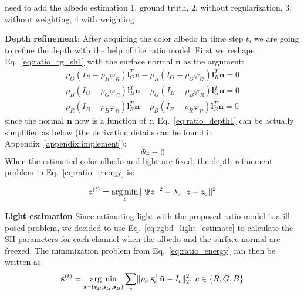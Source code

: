 {\color{red} need to add the albedo estimation 1, ground truth, 2, without regularization, 3, without weighting, 4 with weighting}

\textbf{Depth refinement}:
After acquiring the color albedo in time step $t$, we are going to refine the depth with the help of the ratio model.
First we reshape Eq.~\ref{eq:ratio_rg_sh1} with the surface normal $\mathbf{n}$ as the argument:
\begin{equation}\label{eq:ratio_depth1}
\begin{split}
\rho_G (I_R - \rho_R \varphi_R)\mathbf{l}_G^T \mathbf{n} - \rho_R (I_G - \rho_G \varphi_G)\mathbf{l}_R^T\mathbf{n} = 0\\
\rho_B (I_G - \rho_G \varphi_G)\mathbf{l}_B^T \mathbf{n} - \rho_G (I_B - \rho_B \varphi_B)\mathbf{l}_G^T\mathbf{n} = 0\\
\rho_R (I_B - \rho_B \varphi_B)\mathbf{l}_R^T \mathbf{n} - \rho_B (I_R - \rho_R \varphi_R)\mathbf{l}_B^T\mathbf{n} = 0 
\end{split}
\end{equation}
since the normal $\mathbf{n}$ now is a function of $z$, Eq.~\ref{eq:ratio_depth1} can be actually simplified as below (the derivation details can be found in Appendix~\ref{appendix:implement}):
\begin{equation}
    \Psi z = 0
\end{equation}
When the estimated color albedo and light are fixed, the depth refinement problem in Eq.~\ref{eq:ratio_energy} is:

\begin{equation}\label{eq:ratio_depth_refine}
    z^{(t)}= \operatorname*{arg\,min}_{z}  ||\Psi z||^2 + \lambda_z||z - z_0||^2
\end{equation}

\textbf{Light estimation}
Since estimating light with the proposed ratio model is a ill-posed problem, we decided to use Eq.~\ref{eq:rgbd_light_estimate} to calculate the SH parameters for each channel when the albedo and the surface normal are freezed. The minimization problem from Eq.~\ref{eq:ratio_energy} can then be written as:
\begin{equation}\label{eq:ratio_light_estimate}
    \mathbf{s}^{(t)} = \operatorname*{arg\,min}_{\mathbf{s} = (\mathbf{s}_R, \mathbf{s}_G, \mathbf{s}_B)}\sum_{c} \lVert \rho_c \; \mathbf{s}_c^\top \tilde{\mathbf{n}} - I_c\rVert^2_2, \; c\in\{R,G,B\}
\end{equation}


